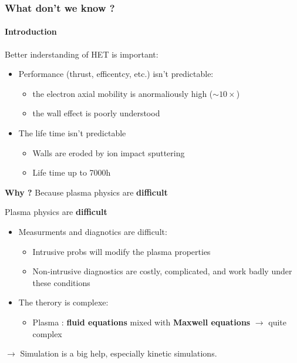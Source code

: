 \documentclass[sans, aspectratio=169]{beamer}
\begin{document}
\begin{frame} 
\frametitle{What don't we know ?} 
\framesubtitle{Introduction} 
Better inderstanding of HET is important:

\begin{itemize}
\item Performance (thrust, efficentcy, etc.) isn't predictable:
	\begin{itemize}
		\item the electron axial mobility is anormaliously high ($\sim 10 \times$)
		\item the wall effect is poorly understood
	\end{itemize}
\item The life time isn't predictable
	\begin{itemize}
		\item Walls are eroded by ion impact sputtering
		\item Life time up to 7000h
	\end{itemize}
\end{itemize}

\begin{center}
\textbf{Why ?} \pause Because plasma physics are \textbf{difficult}

\end{center}
\end{frame}

\begin{frame}{Plasma physics are \textbf{difficult}} 

	\begin{itemize}
	\item Measurments and diagnotics are difficult:
		\begin{itemize}
			\item Intrusive probs will modify the plasma properties
			\item Non-intrusive diagnostics are costly, complicated, and work badly under these conditions
		
		\end{itemize}
	\end{itemize}
	\begin{itemize}
	\item The therory is complexe:
		\begin{itemize}
			\item Plasma : \textbf{fluid equations} mixed with \textbf{Maxwell equations} $\rightarrow$ quite complex
		
		\end{itemize}
	\end{itemize}
	$\rightarrow$ Simulation is a big help, especially kinetic simulations.
\end{frame}
\end{document}
